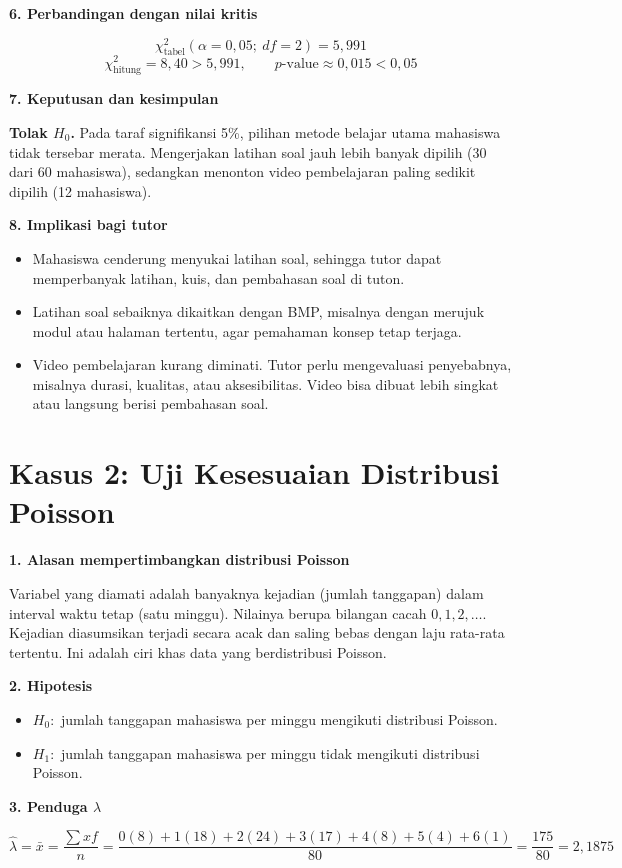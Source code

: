 \documentclass[11pt,a4paper]{article}
\newcommand{\soal}[1]{\par\Needspace{6\baselineskip}\medskip\textbf{#1}\par}
\newcommand{\chisq}{\chi^2}
\begin{document}
\soal{6. Perbandingan dengan nilai kritis}
\[
\chisq_{\text{tabel}}(\alpha = 0{,}05;\ df = 2) = 5{,}991
\]
\[
\chisq_{\text{hitung}} = 8{,}40 > 5{,}991, \qquad p\text{-value} \approx 0{,}015 < 0{,}05
\]

\soal{7. Keputusan dan kesimpulan}
\textbf{Tolak $H_0$.} Pada taraf signifikansi 5\%, pilihan metode belajar utama mahasiswa tidak tersebar merata. Mengerjakan latihan soal jauh lebih banyak dipilih (30 dari 60 mahasiswa), sedangkan menonton video pembelajaran paling sedikit dipilih (12 mahasiswa).

\soal{8. Implikasi bagi tutor}
\begin{itemize}
  \item Mahasiswa cenderung menyukai latihan soal, sehingga tutor dapat memperbanyak latihan, kuis, dan pembahasan soal di tuton.
  \item Latihan soal sebaiknya dikaitkan dengan BMP, misalnya dengan merujuk modul atau halaman tertentu, agar pemahaman konsep tetap terjaga.
  \item Video pembelajaran kurang diminati. Tutor perlu mengevaluasi penyebabnya, misalnya durasi, kualitas, atau aksesibilitas. Video bisa dibuat lebih singkat atau langsung berisi pembahasan soal.
\end{itemize}

\section{Kasus 2: Uji Kesesuaian Distribusi Poisson}

\soal{1. Alasan mempertimbangkan distribusi Poisson}
Variabel yang diamati adalah banyaknya kejadian (jumlah tanggapan) dalam interval waktu tetap (satu minggu). Nilainya berupa bilangan cacah $0, 1, 2, \dots$. Kejadian diasumsikan terjadi secara acak dan saling bebas dengan laju rata-rata tertentu. Ini adalah ciri khas data yang berdistribusi Poisson.

\soal{2. Hipotesis}
\begin{itemize}
  \item $H_0:$ jumlah tanggapan mahasiswa per minggu mengikuti distribusi Poisson.
  \item $H_1:$ jumlah tanggapan mahasiswa per minggu tidak mengikuti distribusi Poisson.
\end{itemize}

\soal{3. Penduga $\lambda$}
\[
\hat\lambda = \bar x = \frac{\sum x f}{n}
= \frac{0(8) + 1(18) + 2(24) + 3(17) + 4(8) + 5(4) + 6(1)}{80}
= \frac{175}{80} = 2{,}1875
\]
\end{document}
